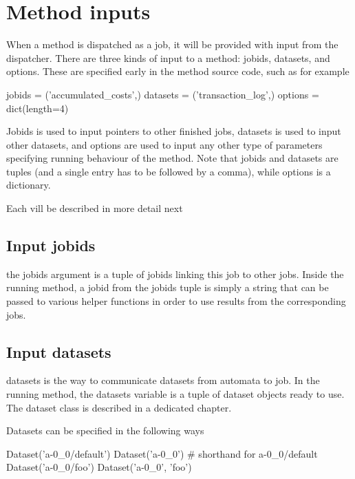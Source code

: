 \section{Method inputs}

When a method is dispatched as a job, it will be provided with input
from the dispatcher.  There are three kinds of input to a method:
jobids, datasets, and options.  These are specified early in the
method source code, such as for example

\begin{python}
jobids = ('accumulated_costs',)
datasets = ('transaction_log',)
options = dict(length=4)
\end{python}

Jobids is used to input pointers to other finished jobs, datasets is
used to input other datasets, and options are used to input any other
type of parameters specifying running behaviour of the method.  Note
that jobids and datasets are tuples (and a single entry has to be
followed by a comma), while options is a dictionary.

Each vill be described in more detail next



\subsection{Input jobids}
the jobids argument is a tuple of jobids linking this job to other
jobs.  Inside the running method, a jobid from the jobids tuple is
simply a string that can be passed to various helper functions in
order to use results from the corresponding jobs.



\subsection{Input datasets}
datasets is the way to communicate datasets from automata to job.  In
the running method, the datasets variable is a tuple of dataset
objects ready to use.  The dataset class is described in a dedicated
chapter.

Datasets can be specified in the following ways

\begin{python}
Dataset('a-0_0/default')
Dataset('a-0_0')          # shorthand for a-0_0/default
Dataset('a-0_0/foo')
Dataset('a-0_0', 'foo')
\end{python}



